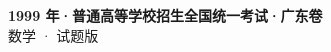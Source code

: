 \documentclass[zihao=-4, a4paper]{ctexart}
\begin{document}
\begin{center}
  {\Large\bfseries 1999 年·普通高等学校招生全国统一考试·广东卷}\\[4pt]
  {\large 数学 · 试题版}
\end{center}
\medskip
{}

\end{document}
